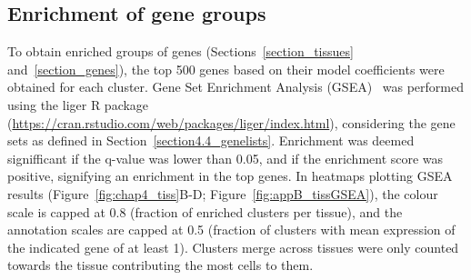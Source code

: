\subsection{Enrichment of gene groups}
\label{section4.4_enr}
To obtain enriched groups of genes (Sections~\ref{section_tissues} and~\ref{section_genes}), the top 500 genes based on their model coefficients were obtained for each cluster. Gene Set Enrichment Analysis (GSEA)~\citep{subramanian_gene_2005} was performed using the liger R package (\url{https://cran.rstudio.com/web/packages/liger/index.html}), considering the gene sets as defined in Section~\ref{section4.4_genelists}. Enrichment was deemed signifficant if the q-value was lower than 0.05, and if the enrichment score was positive, signifying an enrichment in the top genes. In heatmaps plotting GSEA results (Figure~\ref{fig:chap4_tiss}B-D; Figure~\ref{fig:appB_tissGSEA}), the colour scale is capped at 0.8 (fraction of enriched clusters per tissue), and the annotation scales are capped at 0.5 (fraction of clusters with mean expression of the indicated gene of at least 1). Clusters merge across tissues were only counted towards the tissue contributing the most cells to them.


